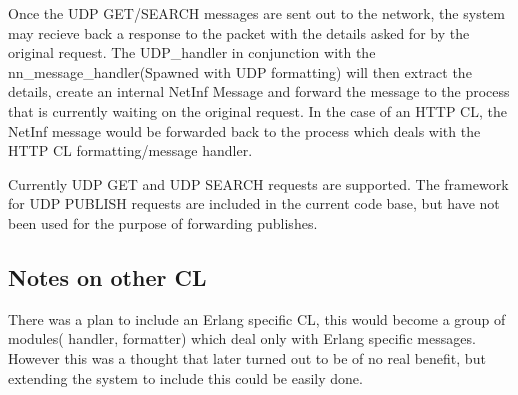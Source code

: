 Once the UDP GET/SEARCH messages are sent out to the network, the system may recieve back a response to the packet with the details asked for by the original request. The UDP\_handler in conjunction with the nn\_message\_handler(Spawned with UDP formatting) will then extract the details, create an internal NetInf Message and forward the message to the process that is currently waiting on the original request. In the case of an HTTP CL, the NetInf message would be forwarded back to the process which deals with the HTTP CL formatting/message handler.

Currently UDP GET and UDP SEARCH requests are supported. The framework for UDP PUBLISH requests are included in the current code base, but have not been used for the purpose of forwarding publishes. 

\subsection {Notes on other CL}

There was a plan to include an Erlang specific CL, this would become a group of modules( handler, formatter) which deal only with Erlang specific messages. However this was a thought that later turned out to be of no real benefit, but extending the system to include this could be easily done. 
